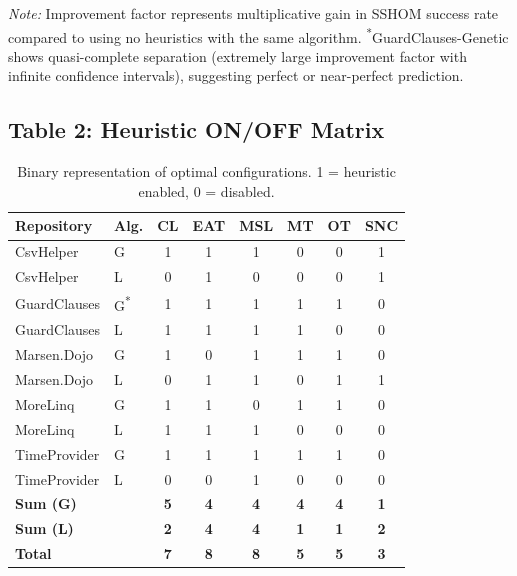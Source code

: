 \documentclass{article}
\begin{document}
\textit{Note:} Improvement factor represents multiplicative gain in SSHOM success rate compared to using no heuristics with the same algorithm. \textsuperscript{*}GuardClauses-Genetic shows quasi-complete separation (extremely large improvement factor with infinite confidence intervals), suggesting perfect or near-perfect prediction.


\subsection*{Table 2: Heuristic ON/OFF Matrix}

\begin{table}[h]
\centering
\caption{Binary representation of optimal configurations. 1 = heuristic enabled, 0 = disabled.}
\label{tab:config_matrix}
\begin{tabular}{@{}llcccccc@{}}
\toprule
\textbf{Repository} & \textbf{Alg.} & \textbf{CL} & \textbf{EAT} & \textbf{MSL} & \textbf{MT} & \textbf{OT} & \textbf{SNC} \\
\midrule
CsvHelper    & G & 1 & 1 & 1 & 0 & 0 & 1 \\
CsvHelper    & L & 0 & 1 & 0 & 0 & 0 & 1 \\
\midrule
GuardClauses & G\textsuperscript{*} & 1 & 1 & 1 & 1 & 1 & 0 \\
GuardClauses & L & 1 & 1 & 1 & 1 & 0 & 0 \\
\midrule
Marsen.Dojo  & G & 1 & 0 & 1 & 1 & 1 & 0 \\
Marsen.Dojo  & L & 0 & 1 & 1 & 0 & 1 & 1 \\
\midrule
MoreLinq     & G & 1 & 1 & 0 & 1 & 1 & 0 \\
MoreLinq     & L & 1 & 1 & 1 & 0 & 0 & 0 \\
\midrule
TimeProvider & G & 1 & 1 & 1 & 1 & 1 & 0 \\
TimeProvider & L & 0 & 0 & 1 & 0 & 0 & 0 \\
\midrule
\textbf{Sum (G)} &   & \textbf{5} & \textbf{4} & \textbf{4} & \textbf{4} & \textbf{4} & \textbf{1} \\
\textbf{Sum (L)} &   & \textbf{2} & \textbf{4} & \textbf{4} & \textbf{1} & \textbf{1} & \textbf{2} \\
\textbf{Total}   &   & \textbf{7} & \textbf{8} & \textbf{8} & \textbf{5} & \textbf{5} & \textbf{3} \\
\bottomrule
\end{tabular}
\end{table}
\end{document}
